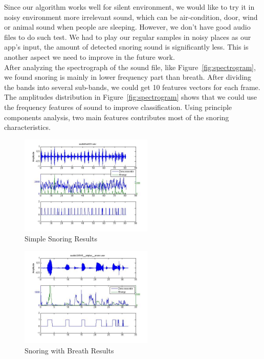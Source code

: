 \documentclass[conference]{IEEEtran}
\begin{document}
Since our algorithm works well for silent environment, we would like to try it in noisy environment more irrelevant sound, which can be air-condition, door, wind or animal sound when people are sleeping. However, we don't have good audio files to do such test. We had to play our regular samples in noisy places as our app's input,  the amount of detected snoring sound is significantly less. This is another aspect we need to improve in the future work.\\

After analyzing the spectrograph of the sound file, like Figure~\ref{fig:spectrogram}, we found snoring is mainly in lower frequency part than breath. After dividing the bands into several sub-bands, we could get 10 features vectors for each frame. The amplitudes distribution in Figure~\ref{fig:spectrogram} shows that we could use the frequency features of sound to improve classification. Using principle components analysis, two main features contributes most of the snoring characteristics. \\


\begin{figure}[!t]
\centering
\includegraphics[width=2.5in]{analysis_regular_snore.jpg}
\caption{Simple Snoring Results}
\label{fig:snoring}
\end{figure}

\begin{figure}[!t]
\centering
\includegraphics[width=2.5in]{analysis_with_breath.jpg}
\caption{Snoring with Breath Results}
\label{fig:snoringbreath}
\end{figure}
\end{document}

